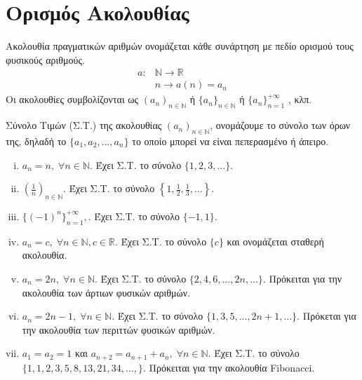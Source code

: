 \documentclass[main.tex]{subfiles}
\begin{document}
\section{Ορισμός Ακολουθίας}

\begin{dfn}
    Ακολουθία πραγματικών αριθμών ονομάζεται κάθε συνάρτηση με πεδίο ορισμού 
    τους φυσικούς αριθμούς. 
    \begin{align*}
        a \colon &\mathbb{N} \to \mathbb{R} \\
                 &n \to a(n)=a_{n}
    \end{align*} 
    Οι ακολουθίες συμβολίζονται ως $ (a_{n})_{n \in \mathbb{N}} $  
    ή $ \{ a_{n} \} _{n \in \mathbb{N}} $  ή $ \{ a_{n} \} _{n=1}^{+\infty}$
    , κλπ.
\end{dfn}

\begin{dfn}
    Σύνολο Τιμών (Σ.Τ.) της ακολουθίας $ (a_{n})_{n \in \mathbb{N}} $, 
    ονομάζουμε το σύνολο των όρων της, δηλαδή το $ \{ a_{1}, a_{2}, \ldots,
    a_{n} \} $ το οποίο μπορεί να είναι πεπερασμένο ή άπειρο.
\end{dfn}

\begin{examples}
\item {}
    \begin{enumerate}[i)]
        \item $ a_{n} = n, \; \forall n \in \mathbb{N} $. Έχει Σ.Τ. 
            το σύνολο $  \{ 1,2,3, \ldots \} $.
        \item $\left(\frac{1}{n}\right)_{n \in \mathbb{N}} $. Έχει Σ.Τ. το 
            σύνολο 
            $  \left\{ 1, \frac{1}{2}, \frac{1}{3}, \ldots \right\} $.
        \item $ \{(-1)^{n}\}_{n=1}^{+ \infty}, $. Έχει Σ.Τ. 
            το σύνολο $ \{ -1,1 \} $.
        \item $ a_{n} = c, \; \forall n \in \mathbb{N}, c \in \mathbb{R} $.
            Έχει Σ.Τ. το σύνολο $ \{ c \} $ και ονομάζεται σταθερή ακολουθία.
        \item $ a_{n}=2n, \; \forall n \in \mathbb{N} $. Έχει Σ.Τ. το σύνολο 
            $ \{ 2,4,6, \ldots, 2n, \ldots \} $. Πρόκειται για την ακολουθία 
            των άρτιων φυσικών αριθμών.
        \item $ a_{n}= 2n-1, \; \forall n \in \mathbb{N} $. Έχει Σ.Τ. το 
            σύνολο $ \{ 1,3,5, \ldots, 2n+1, \ldots \} $. Πρόκεται για την 
            ακολουθία των περιττών φυσικών αριθμών.
        \item \label{ex:anadr} $ a_{1}= a_{2} = 1 $ και $ a_{n+2}=a_{n+1}
            +a_{n}, \; \forall n \in \mathbb{N}$. Έχει Σ.Τ. το 
            σύνολο $ \{ 1,1,2,3,5,8, 13,21,34, \ldots,\} $. 
            Πρόκειται για την ακολουθία Fibonacci. 
    \end{enumerate}
\end{examples}
\end{document}
